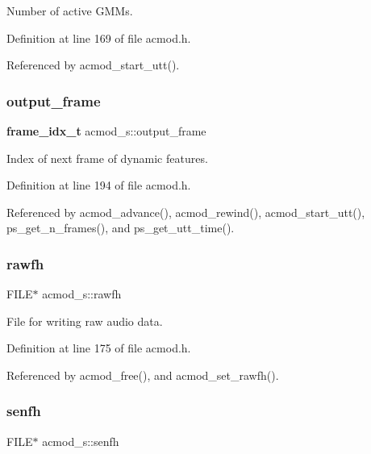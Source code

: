 Number of active G\+M\+Ms. 



Definition at line 169 of file acmod.\+h.



Referenced by acmod\+\_\+start\+\_\+utt().

\mbox{\label{structacmod__s_aec694af0767ac5e8f1022b6252111885}} 
\subsubsection{output\+\_\+frame}
{\footnotesize\ttfamily \textbf{ frame\+\_\+idx\+\_\+t} acmod\+\_\+s\+::output\+\_\+frame}



Index of next frame of dynamic features. 



Definition at line 194 of file acmod.\+h.



Referenced by acmod\+\_\+advance(), acmod\+\_\+rewind(), acmod\+\_\+start\+\_\+utt(), ps\+\_\+get\+\_\+n\+\_\+frames(), and ps\+\_\+get\+\_\+utt\+\_\+time().

\mbox{\label{structacmod__s_aeac89442a04744ca607c4c66dab053e8}} 
\subsubsection{rawfh}
{\footnotesize\ttfamily F\+I\+LE$\ast$ acmod\+\_\+s\+::rawfh}



File for writing raw audio data. 



Definition at line 175 of file acmod.\+h.



Referenced by acmod\+\_\+free(), and acmod\+\_\+set\+\_\+rawfh().

\mbox{\label{structacmod__s_aba97a9733b64074f3a4699dfbaed5ffd}} 
\subsubsection{senfh}
{\footnotesize\ttfamily F\+I\+LE$\ast$ acmod\+\_\+s\+::senfh}



